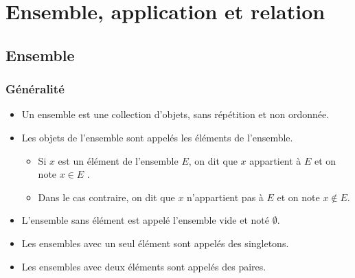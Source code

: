 \chapter{Ensemble, application et relation}

\minitoc

\section{Ensemble}
\subsection{Généralité}
\begin{defi}
    \begin{itemize}
        \item Un ensemble est une collection d’objets, sans répétition et non ordonnée.
        \item Les objets de l’ensemble sont appelés les éléments de l’ensemble.
        \begin{itemize}
            \item Si \(x\) est un élément de l’ensemble \(E\), on dit que \(x\) appartient à \(E\) et on note \(x \in E\) .
            \item Dans le cas contraire, on dit que \(x\) n’appartient pas à \(E\) et on note \(x \notin E\).
        \end{itemize}
        \item L’ensemble sans élément est appelé l’ensemble vide et noté \(\emptyset\).
        \item Les ensembles avec un seul élément sont appelés des singletons.
        \item Les ensembles avec deux éléments sont appelés des paires.
    \end{itemize}
\end{defi}
